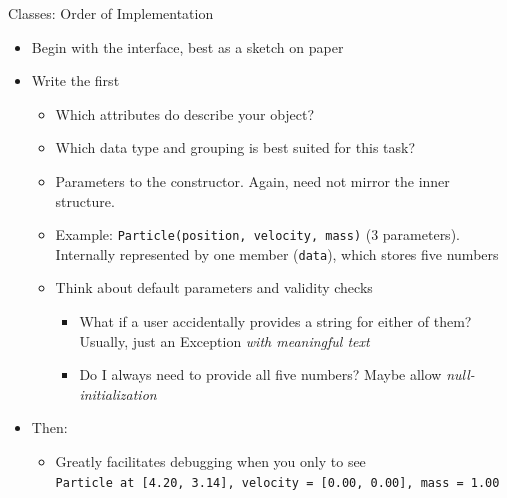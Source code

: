 \begin{frame}{Classes: Order of Implementation}
%
\begin{itemize}
\item Begin with the interface, best as a sketch on paper
\item Write the  first
	\begin{itemize}
	\item Which attributes do describe your object?
	\item Which data type and grouping is best suited for this task?
	\item Parameters to the constructor. Again, need not mirror the inner structure.
	\item Example: \texttt{Particle(position, velocity, mass)} (3 parameters). Internally represented by one member (\texttt{data}), which stores five numbers
	\item Think about default parameters and validity checks
		\begin{itemize}
		\item What if a user accidentally provides a string for either of them?\\
			Usually, just  an Exception \emph{with meaningful text}
		\item Do I always need to provide all five numbers? Maybe allow \emph{null-initialization}
		\end{itemize}
	\end{itemize}
\item Then: 
	\begin{itemize}
	\item Greatly facilitates debugging when you only  to see\\
		\texttt{Particle at [4.20, 3.14], velocity = [0.00, 0.00], mass = 1.00}
	\end{itemize}
\end{itemize}
%
\end{frame}


